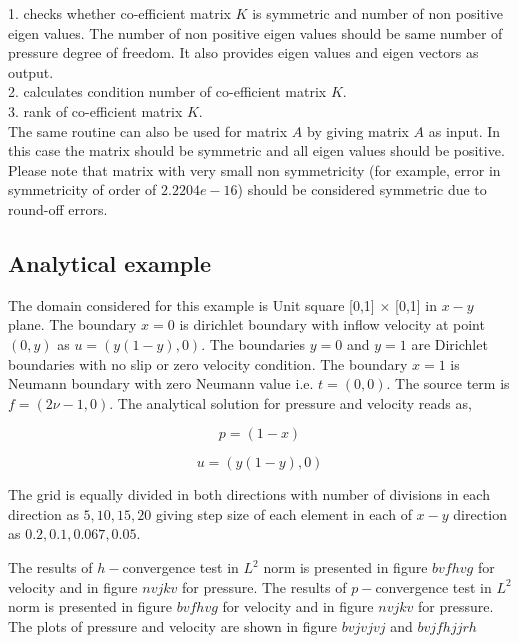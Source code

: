 \documentclass[a4paper,12pt]{book}
\begin{document}
1. checks whether co-efficient matrix $K$ is symmetric and number of non positive eigen values. The number of non positive eigen values should be same number of pressure degree of freedom. It also provides eigen values and eigen vectors as output.\\

2. calculates condition number of co-efficient matrix $K$. \\

3. rank of co-efficient matrix $K$.\\

The same routine can also be used for matrix $A$ by giving matrix $A$ as input. In this case the matrix should be symmetric and all eigen values should be positive.\\

Please note that matrix with very small non symmetricity (for example, error in symmetricity of order of $2.2204e-16$) should be considered symmetric due to round-off errors.

\subsection{Analytical example}

The domain considered for this example is Unit square [0,1] $\times$ [0,1] in $x-y$ plane. 
The boundary ${x=0}$ is dirichlet boundary with inflow velocity at point $(0,y)$ as $u = (y(1-y), 0)$. The boundaries ${y = 0}$ and ${y = 1}$ are Dirichlet boundaries with no slip or zero velocity condition. The boundary ${x = 1}$ is Neumann boundary with zero Neumann value i.e. $t = (0, 0)$. The source term is $f = (2 \nu - 1, 0)$. The analytical solution for pressure and velocity reads as,

\begin{center}

\begin{equation}
p = (1 - x)
\end{equation}

\begin{equation} 
 u = (y(1-y), 0)
\end{equation}

\end{center}

The grid is equally divided in both directions with number of divisions in each direction as $5,10,15,20$ giving step size of each element in each of $x-y$ direction as $0.2,0.1,0.067,0.05$.

The results of $h-$convergence test in $L^2$ norm is presented in figure $bvfhvg$ for velocity and in figure $nvjkv$ for pressure. The results of $p-$convergence test in $L^2$ norm is presented in figure $bvfhvg$ for velocity and in figure $nvjkv$ for pressure. The plots of pressure and velocity are shown in figure $bvjvjvj$ and $bvjfhjjrh$
\end{document}
